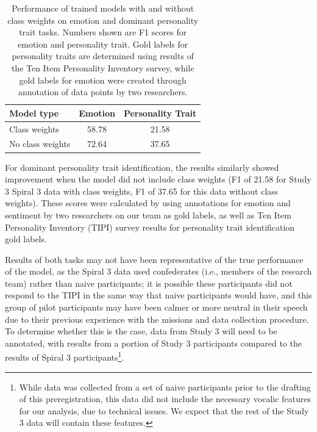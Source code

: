 \begin{table}
    \small
    \centering
    \begin{tabular}{lcc}
        \toprule
        Model type & Emotion & Personality Trait \\
        \midrule
        Class weights & 58.78 & 21.58 \\
        No class weights & 72.64 & 37.65 \\
        \bottomrule
    \end{tabular}
    \caption{%
        Performance of trained models with and without class weights on
        emotion and dominant personality trait tasks. Numbers shown are F1 scores
        for emotion and personality trait. Gold labels for personality traits are
        determined using results of the Ten Item Personality Inventory survey,
        while gold labels for emotion were created through annotation of data
        points by two researchers.
    }
    \label{tab:spiral3_analysis}
\end{table}

For dominant personality trait identification, the results similarly showed
improvement when the model did not include class weights (F1 of 21.58 for Study
3 Spiral 3 data with class weights, F1 of 37.65 for this data without class
weights). These scores were calculated by using annotations for emotion and
sentiment by two researchers on our team as gold labels, as well as Ten Item
Personality Inventory (TIPI) survey results for personality trait
identification gold labels.

Results of both tasks may not have been representative of the true performance
of the model, as the Spiral 3 data used confederates (i.e., members of the
research team) rather than naive participants; it is possible these
participants did not respond to the TIPI in the same way that naive
participants would have, and this group of pilot participants may have been
calmer or more neutral in their speech due to their previous experience with
the missions and data collection procedure. To determine whether this is the
case, data from Study 3 will need to be annotated, with results from a portion
of Study 3 participants compared to the results of Spiral 3
participants\footnote{While data was collected from a set of naive participants
prior to the drafting of this preregistration, this data did not include the
necessary vocalic features for our analysis, due to technical issues. We expect
that the rest of the Study 3 data will contain these features.}.

